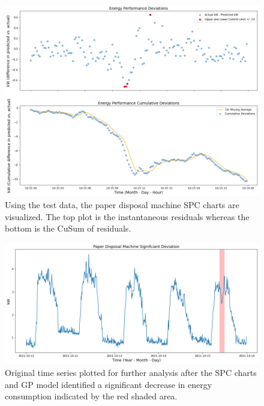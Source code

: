 \begin{figure}[h]
\centering
\graphicspath{ {./images/} }
\includegraphics[scale=0.49]{images/entsorgung_test_SPC.png}
\caption{Using the test data, the paper disposal machine SPC charts are visualized. The top plot is the instantaneous residuals whereas the bottom is the CuSum of residuals.}
\end{figure}

\begin{figure}[h]
\centering
\graphicspath{ {./images/} }
\includegraphics[scale=0.49]{images/entsorgung_deviation.png}
\caption{Original time series plotted for further analysis after the SPC charts and GP model identified a significant decrease in energy consumption indicated by the red shaded area.}
\end{figure}

